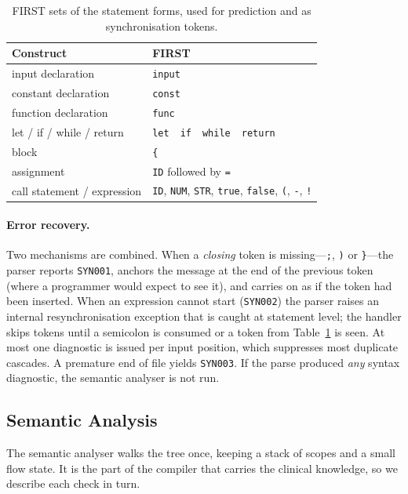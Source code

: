 \documentclass[conference]{IEEEtran}
\newcommand{\code}[1]{\texttt{#1}}
\begin{document}
\begin{table}[t]
\centering
\caption{FIRST sets of the statement forms, used for prediction and as synchronisation tokens.}
\label{tab:first}
\footnotesize
\begin{tabular}{ll}
\toprule
\textbf{Construct} & \textbf{FIRST}\\
\midrule
input declaration & \code{input}\\
constant declaration & \code{const}\\
function declaration & \code{func}\\
let / if / while / return & \code{let}\ \ \code{if}\ \ \code{while}\ \ \code{return}\\
block & \code{\{}\\
assignment & \code{ID} followed by \code{=}\\
call statement / expression & \code{ID}, \code{NUM}, \code{STR}, \code{true}, \code{false}, \code{(}, \code{-}, \code{!}\\
\bottomrule
\end{tabular}
\end{table}

\paragraph{Error recovery.} Two mechanisms are combined. When a \emph{closing} token is missing---\code{;},
\code{)} or \code{\}}---the parser reports \code{SYN001}, anchors the message at the end of the previous token (where
a programmer would expect to see it), and carries on as if the token had been inserted. When an expression cannot
start (\code{SYN002}) the parser raises an internal resynchronisation exception that is caught at statement level;
the handler skips tokens until a semicolon is consumed or a token from Table~\ref{tab:first} is seen. At most one
diagnostic is issued per input position, which suppresses most duplicate cascades. A premature end of file yields
\code{SYN003}. If the parse produced \emph{any} syntax diagnostic, the semantic analyser is not run.

\subsection{Semantic Analysis}

The semantic analyser walks the tree once, keeping a stack of scopes and a small flow state. It is the part of the
compiler that carries the clinical knowledge, so we describe each check in turn.
\end{document}
